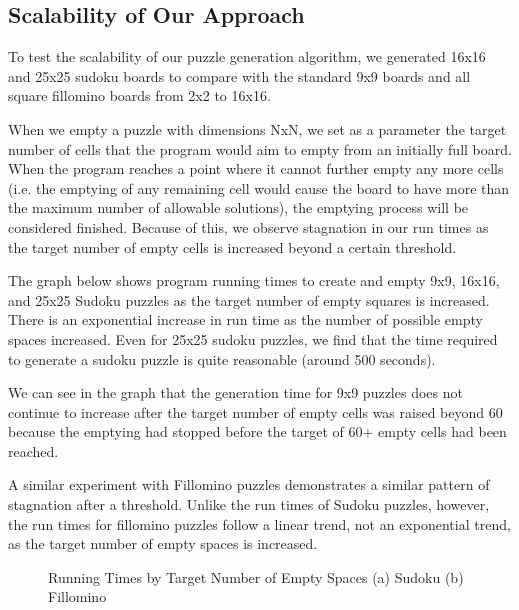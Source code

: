 \subsection{Scalability of Our Approach}

To test the scalability of our puzzle generation algorithm, we generated 16x16 and 25x25 sudoku boards to compare with the standard 9x9 boards and all square fillomino boards from 2x2 to 16x16.

When we empty a puzzle with dimensions NxN, we set as a parameter the target number of cells that the program would aim to empty from an initially full board. When the program reaches a point where it cannot further empty any more cells (i.e. the emptying of any remaining cell would cause the board to have more than the maximum number of allowable solutions), the emptying process will be considered finished. Because of this, we observe stagnation in our run times as the target number of empty cells is increased beyond a certain threshold. 

The graph below shows program running times to create and empty 9x9, 16x16, and 25x25 Sudoku puzzles as the target number of empty squares is increased. There is an exponential increase in run time as the number of possible empty spaces increased. Even for 25x25 sudoku puzzles, we find that the time required to generate a sudoku puzzle is quite reasonable (around 500 seconds).

We can see in the graph that the generation time for 9x9 puzzles does not continue to increase after the target number of empty cells was raised beyond 60 because the emptying had stopped before the target of 60+ empty cells had been reached. 

A similar experiment with Fillomino puzzles demonstrates a similar pattern of stagnation after a threshold. Unlike the run times of Sudoku puzzles, however, the run times for fillomino puzzles follow a linear trend, not an exponential trend, as the target number of empty spaces is increased.

\begin{figure}
     \centering
     \caption{Running Times by Target Number of Empty Spaces (a) Sudoku (b) Fillomino}
\end{figure}





